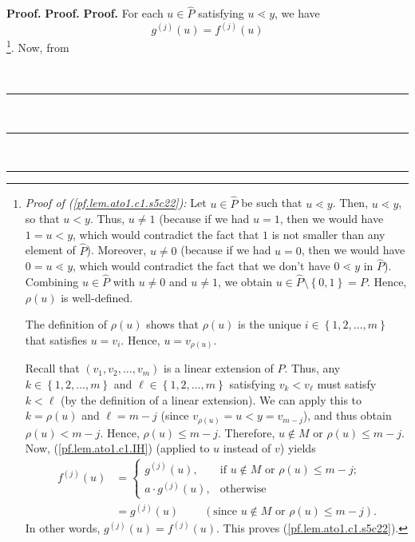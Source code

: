 \documentclass[numbers=enddot,12pt,final,onecolumn,notitlepage]{scrartcl}%
\theoremstyle{definition}
\newenvironment{verlong}{}{}
\newenvironment{proof}[1][Proof]{\noindent\textbf{#1.} }{\ \rule{0.5em}{0.5em}}
\begin{document}
\begin{verlong}
\begin{proof}
\begin{proof}
\begin{proof}
For each $u\in\widehat{P}$ satisfying $u\lessdot y$, we have%
\begin{equation}
g^{\left(  j\right)  }\left(  u\right)  =f^{\left(  j\right)  }\left(
u\right)  \label{pf.lem.ato1.c1.s5c22}%
\end{equation}
\footnote{\textit{Proof of (\ref{pf.lem.ato1.c1.s5c22}):} Let $u\in
\widehat{P}$ be such that $u\lessdot y$. Then, $u\lessdot y$, so that $u<y$.
Thus, $u\neq1$ (because if we had $u=1$, then we would have $1=u<y$, which
would contradict the fact that $1$ is not smaller than any element of
$\widehat{P}$). Moreover, $u\neq0$ (because if we had $u=0$, then we would
have $0=u\lessdot y$, which would contradict the fact that we don't have
$0\lessdot y$ in $\widehat{P}$). Combining $u\in\widehat{P}$ with $u\neq0$ and
$u\neq1$, we obtain $u\in\widehat{P}\setminus\left\{  0,1\right\}  =P$. Hence,
$\rho\left(  u\right)  $ is well-defined.
\par
The definition of $\rho\left(  u\right)  $ shows that $\rho\left(  u\right)  $
is the unique $i\in\left\{  1,2,\ldots,m\right\}  $ that satisfies $u=v_{i}$.
Hence, $u=v_{\rho\left(  u\right)  }$.
\par
Recall that $\left(  v_{1},v_{2},\ldots,v_{m}\right)  $ is a linear extension
of $P$. Thus, any $k\in\left\{  1,2,\ldots,m\right\}  $ and $\ell\in\left\{
1,2,\ldots,m\right\}  $ satisfying $v_{k}<v_{\ell}$ must satisfy $k<\ell$ (by
the definition of a linear extension). We can apply this to $k=\rho\left(
u\right)  $ and $\ell=m-j$ (since $v_{\rho\left(  u\right)  }=u<y=v_{m-j}$),
and thus obtain $\rho\left(  u\right)  <m-j$. Hence, $\rho\left(  u\right)
\leq m-j$. Therefore, $u\notin M$ or $\rho\left(  u\right)  \leq m-j$. Now,
(\ref{pf.lem.ato1.c1.IH}) (applied to $u$ instead of $v$) yields
\begin{align*}
f^{\left(  j\right)  }\left(  u\right)   &  =%
\begin{cases}
g^{\left(  j\right)  }\left(  u\right)  , & \text{if }u\notin M\text{ or }%
\rho\left(  u\right)  \leq m-j;\\
a\cdot g^{\left(  j\right)  }\left(  u\right)  , & \text{otherwise}%
\end{cases}
\\
&  =g^{\left(  j\right)  }\left(  u\right)  \ \ \ \ \ \ \ \ \ \ \left(
\text{since }u\notin M\text{ or }\rho\left(  u\right)  \leq m-j\right)  .
\end{align*}
In other words, $g^{\left(  j\right)  }\left(  u\right)  =f^{\left(  j\right)
}\left(  u\right)  $. This proves (\ref{pf.lem.ato1.c1.s5c22}).}. Now, from

\end{proof}
\end{proof}
\end{proof}
\end{verlong}
\end{document}
